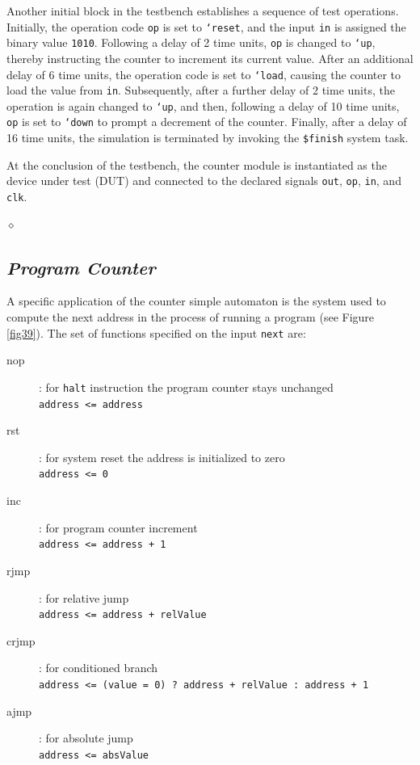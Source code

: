 Another initial block in the testbench establishes a sequence of test operations. Initially, the operation code \texttt{op} is set to \texttt{`reset}, and the input \texttt{in} is assigned the binary value \texttt{1010}. Following a delay of 2 time units, \texttt{op} is changed to \texttt{`up}, thereby instructing the counter to increment its current value. After an additional delay of 6 time units, the operation code is set to \texttt{`load}, causing the counter to load the value from \texttt{in}. Subsequently, after a further delay of 2 time units, the operation is again changed to \texttt{`up}, and then, following a delay of 10 time units, \texttt{op} is set to \texttt{`down} to prompt a decrement of the counter. Finally, after a delay of 16 time units, the simulation is terminated by invoking the \texttt{\$finish} system task.

At the conclusion of the testbench, the counter module is instantiated as the device under test (DUT) and connected to the declared signals \texttt{out}, \texttt{op}, \texttt{in}, and \texttt{clk}.

$\diamond$


\subsection{{\bf {\em Program Counter}}}\label{progCounter}

A specific application of the counter simple automaton is the system used to compute the next address in the process of running a program (see Figure \ref{fig39}). The set of functions specified on the input {\tt next} are:
\begin{description}
    \item[nop]: for {\tt halt} instruction the program counter stays unchanged \\ 
        {\tt  address <= address} 
    \item[rst]: for system reset the address is initialized to zero \\
        {\tt  address <= 0} 
    \item[inc]: for program counter increment \\
        {\tt  address <= address + 1} 
    \item[rjmp]: for relative jump \\
        {\tt address <= address + relValue} 
    \item[crjmp]: for conditioned branch \\
        {\tt  address <= (value = 0) ? address + relValue : address + 1} 
    \item[ajmp]: for absolute jump \\
        {\tt  address <= absValue} 
\end{description}


